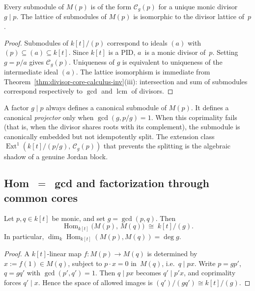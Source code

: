 \begin{corollary}
\label{cor:divisors-classify-submodules-inv}
Every submodule of $M(p)$ is of the form $\mathcal{C}_g(p)$
for a unique monic divisor $g \mid p$. The lattice of
submodules of $M(p)$ is isomorphic to the divisor lattice
of~$p$.
\end{corollary}

\begin{proof}
Submodules of $k[t]/(p)$ correspond to ideals $(a)$ with
$(p) \subseteq (a) \subseteq k[t]$. Since $k[t]$ is a PID,
$a$~is a monic divisor of~$p$. Setting $g = p/a$ gives
$\mathcal{C}_g(p)$.
Uniqueness of $g$ is equivalent to uniqueness of the intermediate ideal
$(a)$.
The lattice isomorphism is immediate from
Theorem~\ref{thm:divisor-core-calculus-inv}(iii): intersection and
sum of submodules correspond respectively to $\gcd$ and
$\operatorname{lcm}$ of divisors.
\end{proof}

\begin{remark}
\label{rem:first-structural-correction}
A factor $g \mid p$ always defines a canonical submodule of
$M(p)$. It defines a canonical \emph{projector} only when
$\gcd(g,p/g) = 1$. When this coprimality fails (that is,
when the divisor shares roots with its complement), the
submodule is canonically embedded but not idempotently split.
The extension class $\operatorname{Ext}^1(k[t]/(p/g),\,
\mathcal{C}_g(p))$ that prevents the splitting is the
algebraic shadow of a genuine Jordan block.
\end{remark}

\subsection{Hom~\texorpdfstring{$=$}{=}~gcd and factorization
 through common cores}
\label{subsec:hom-gcd-factorization}

\begin{theorem}[\texorpdfstring{$\operatorname{Hom} =
 \gcd$}{Hom = gcd}; \ClaimStatusProvedHere]
\label{thm:hom-equals-gcd-inv}
Let $p,q \in k[t]$ be monic, and set $g = \gcd(p,q)$. Then
\[
\operatorname{Hom}_{k[t]}\!\bigl(M(p),\,M(q)\bigr)
 \;\cong\; k[t]/(g).
\]
In particular,
$\dim_k\operatorname{Hom}_{k[t]}(M(p),M(q)) = \deg g$.
\end{theorem}

\begin{proof}
A $k[t]$-linear map $f \colon M(p) \to M(q)$ is determined by
$x := f(1) \in M(q)$, subject to $p \cdot x = 0$ in~$M(q)$,
i.e.\ $q \mid px$. Write $p = gp'$, $q = gq'$ with
$\gcd(p',q') = 1$. Then $q \mid px$ becomes $q' \mid p'x$,
and coprimality forces $q' \mid x$. Hence the space of
allowed images is $(q')/(gq') \cong k[t]/(g)$.
\end{proof}

